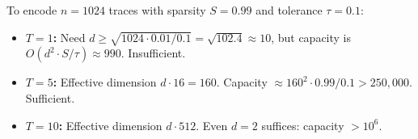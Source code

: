 \begin{example}
\label{ex:concrete}
To encode $n = 1024$ traces with sparsity $S = 0.99$ and tolerance $\tau = 0.1$:
\begin{itemize}
    \item \textbf{$T = 1$:} Need $d \geq \sqrt{1024 \cdot 0.01 / 0.1} = \sqrt{102.4} \approx 10$, but capacity is $O(d^2 \cdot S / \tau) \approx 990$. Insufficient.
    \item \textbf{$T = 5$:} Effective dimension $d \cdot 16 = 160$. Capacity $\approx 160^2 \cdot 0.99 / 0.1 > 250{,}000$. Sufficient.
    \item \textbf{$T = 10$:} Effective dimension $d \cdot 512$. Even $d = 2$ suffices: capacity $> 10^6$.
\end{itemize}
\end{example}
